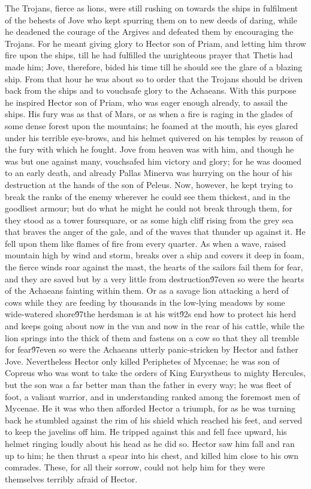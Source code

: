 {The Trojans, fierce as lions, were still rushing on towards the ships in fulfilment of the behests of Jove who kept spurring them on to new deeds of daring, while he deadened the courage of the Argives and defeated them by encouraging the Trojans. For he meant giving glory to Hector son of Priam, and letting him throw fire upon the ships, till he had fulfilled the unrighteous prayer that Thetis had made him; Jove, therefore, bided his time till he should see the glare of a blazing ship. From that hour he was about so to order that the Trojans should be driven back from the ships and to vouchsafe glory to the Achaeans. With this purpose he inspired Hector son of Priam, who was eager enough already, to assail the ships. His fury was as that of Mars, or as when a fire is raging in the glades of some dense forest upon the mountains; he foamed at the mouth, his eyes glared under his terrible eye-brows, and his helmet quivered on his temples by reason of the fury with which he fought. Jove from heaven was with him, and though he was but one against many, vouchsafed him victory and glory; for he was doomed to an early death, and already Pallas Minerva was hurrying on the hour of his destruction at the hands of the son of Peleus. Now, however, he kept trying to break the ranks of the enemy wherever he could see them thickest, and in the goodliest armour; but do what he might he could not break through them, for they stood as a tower foursquare, or as some high cliff rising from the grey sea that braves the anger of the gale, and of the waves that thunder up against it. He fell upon them like flames of fire from every quarter. As when a wave, raised mountain high by wind and storm, breaks over a ship and covers it deep in foam, the fierce winds roar against the mast, the hearts of the sailors fail them for fear, and they are saved but by a very little from destruction\'97even so were the hearts of the Achaeans fainting within them. Or as a savage lion attacking a herd of cows while they are feeding by thousands in the low-lying meadows by some wide-watered shore\'97the herdsman is at his wit\'92s end how to protect his herd and keeps going about now in the van and now in the rear of his cattle, while the lion springs into the thick of them and fastens on a cow so that they all tremble for fear\'97even so were the Achaeans utterly panic-stricken by Hector and father Jove. Nevertheless Hector only killed Periphetes of Mycenae; he was son of Copreus who was wont to take the orders of King Eurystheus to mighty Hercules, but the son was a far better man than the father in every way; he was fleet of foot, a valiant warrior, and in understanding ranked among the foremost men of Mycenae. He it was who then afforded Hector a triumph, for as he was turning back he stumbled against the rim of his shield which reached his feet, and served to keep the javelins off him. He tripped against this and fell face upward, his helmet ringing loudly about his head as he did so. Hector saw him fall and ran up to him; he then thrust a spear into his chest, and killed him close to his own comrades. These, for all their sorrow, could not help him for they were themselves terribly afraid of Hector.\
}
